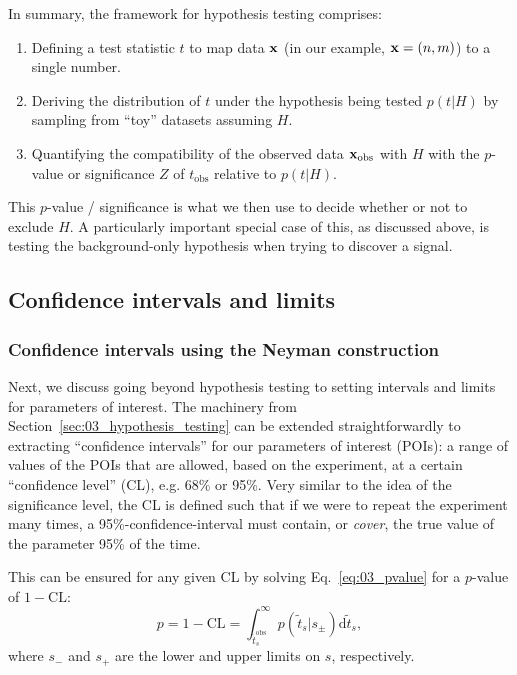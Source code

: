 
In summary, the framework for hypothesis testing comprises:

\begin{enumerate}
    \item Defining a test statistic $t$ to map data $\mathbf{x}$ (in our example, $\mathbf{x} = (n, m)$) to a single number.
    \item Deriving the distribution of $t$ under the hypothesis being tested $p(t|H)$ by sampling from ``toy'' datasets assuming $H$.
    \item Quantifying the compatibility of the observed data $\mathbf{x}_{\mathrm{obs}}$ with $H$ with the $p$-value or significance $Z$ of $t_{\mathrm{obs}}$ relative to $p(t|H)$.
\end{enumerate}

This $p$-value / significance is what we then use to decide whether or not to exclude $H$. 
A particularly important special case of this, as discussed above, is testing the background-only hypothesis when trying to discover a signal.

\subsection{Confidence intervals and limits}
\label{sec:03_intervals}

\subsubsection{Confidence intervals using the Neyman construction}

Next, we discuss going beyond hypothesis testing to setting intervals and limits for parameters of interest.
The machinery from Section~\ref{sec:03_hypothesis_testing} can be extended straightforwardly to extracting ``confidence intervals'' for our parameters of interest (POIs): a range of values of the POIs that are allowed, based on the experiment, at a certain ``confidence level'' (CL), e.g. 68\% or 95\%. 
Very similar to the idea of the significance level, the CL is defined such that if we were to repeat the experiment many times, a 95\%-confidence-interval must contain, or \textit{cover}, the true value of the parameter 95\% of the time. 

This can be ensured for any given CL by solving Eq.~\ref{eq:03_pvalue} for a $p$-value of $1 - \mathrm{CL}$: 
\begin{equation}
p = 1 - \mathrm{CL} = \int_{\tilde{t}^{\mathrm{obs}}_s}^{\infty}p(\tilde{t}_s|s_\pm)\mathrm d \tilde{t}_s,
\label{eq:03_cl}
\end{equation}
where $s_-$ and $s_+$ are the lower and upper limits on $s$, respectively.

